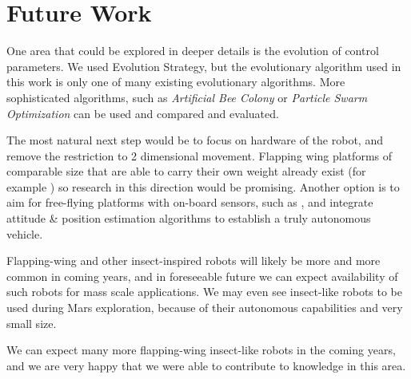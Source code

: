 \section{Future Work}
One area that could be explored in deeper details is the evolution of control parameters. We used Evolution Strategy, but the evolutionary algorithm used in this work is only one of many existing evolutionary algorithms. More sophisticated algorithms, such as \textit{Artificial Bee Colony} \cite{Karaboga2007} or \textit{Particle Swarm Optimization} \cite{Hatanaka2007} can be used and compared and evaluated.

The most natural next step would be to focus on hardware of the robot, and remove the restriction to 2 dimensional movement. Flapping wing platforms of comparable size that are able to carry their own weight already exist (for example \cite{Hines2015}) so research in this direction would be promising. Another option is to aim for free-flying platforms with on-board sensors, such as \cite{Rosen2016}, and integrate attitude \& position estimation algorithms to establish a truly autonomous vehicle.

Flapping-wing and other insect-inspired robots will likely be more and more common in coming years, and in foreseeable future we can expect availability of such robots for mass scale applications. We may even see insect-like robots to be used during Mars exploration, because of their autonomous capabilities and very small size.

We can expect many more flapping-wing insect-like robots in the coming years, and we are very happy that we were able to contribute to knowledge in this area.